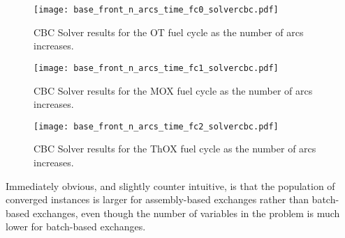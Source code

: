 \begin{figure}[h!]
  \begin{center}
    \texttt{[image: base\_front\_n\_arcs\_time\_fc0\_solvercbc.pdf]}
    \caption[]{
      \label{fig:base_front_n_arcs_time_fc0_solvercbc}
      CBC Solver results for the OT fuel cycle as the number of arcs
      increases.
      }
  \end{center}
\end{figure}

\begin{figure}[h!]
  \begin{center}
    \texttt{[image: base\_front\_n\_arcs\_time\_fc1\_solvercbc.pdf]}
    \caption[]{
      \label{fig:base_front_n_arcs_time_fc1_solvercbc}
      CBC Solver results for the MOX fuel cycle as the number of arcs
      increases.
      }
  \end{center}
\end{figure}

\begin{figure}[h!]
  \begin{center}
    \texttt{[image: base\_front\_n\_arcs\_time\_fc2\_solvercbc.pdf]}
    \caption[]{
      \label{fig:base_front_n_arcs_time_fc2_solvercbc}
      CBC Solver results for the ThOX fuel cycle as the number of arcs
      increases.
      }
  \end{center}
\end{figure}

Immediately obvious, and slightly counter intuitive, is that the population of
converged instances is larger for assembly-based exchanges rather than
batch-based exchanges, even though the number of variables in the problem is
much lower for batch-based exchanges. 





